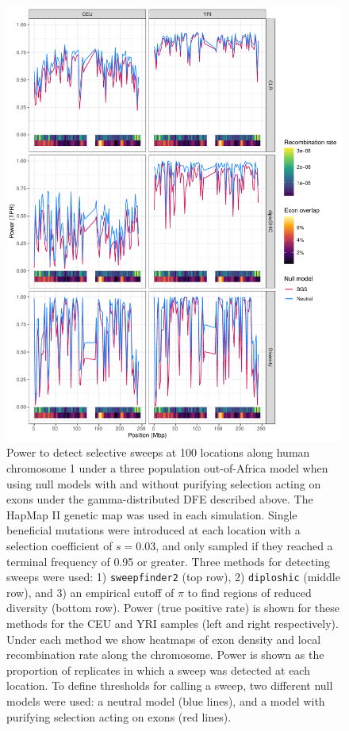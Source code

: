 \documentclass[hidelinks]{article}
\newcommand{\sweepfinder}{\texttt{sweepfinder2}\xspace}
\newcommand{\diploshic}{\texttt{diploshic}\xspace}
\begin{document}
    \begin{figure}
        \centering
        \includegraphics[width=0.8 \textwidth]{figures/sweeps/chr1_power.pdf}
        \caption{
        Power to detect selective sweeps at 100 locations along human
        chromosome 1 under a three population out-of-Africa model
        \citep{gutenkunst2009inferring} when using null models with and without
        purifying selection acting on exons under the gamma-distributed DFE
        described above.  The HapMap II genetic map
        \citep{international2007second} was used in each simulation.  Single
        beneficial mutations were introduced at each location with a selection
        coefficient of $s = 0.03$, and only sampled if they reached a terminal
        frequency of 0.95 or greater.  Three methods for detecting sweeps were
        used: 1) \sweepfinder \citep{degiorgio2016sweepfinder2} (top row), 2)
        \diploshic \citep{kern2018diplos} (middle row), and 3) an empirical
        cutoff of $\pi$ to find regions of reduced diversity (bottom row).
        Power (true positive rate) is shown for these methods for the CEU and YRI
        samples (left and right respectively).  Under each method we show
        heatmaps of exon density and local recombination rate along the
        chromosome.  Power is shown as the proportion of replicates in which a
        sweep was detected at each location.  To define
        thresholds for calling a sweep, two different null models were used: a
        neutral model (blue lines), and a model with purifying selection acting
        on exons (red lines).
        }
        \label{fig:chr1_power}
    \end{figure}
    
\end{document}
